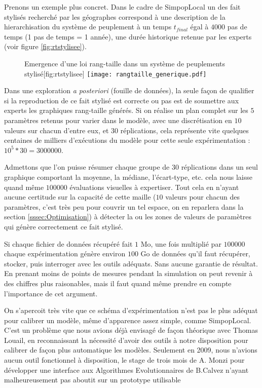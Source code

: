 Prenons un exemple plus concret. Dans le cadre de SimpopLocal \autocites{Schmitt2015,Schmitt2014} un des fait stylisés recherché par les géographes correspond à une description de la hierarchisation du système de peuplement à un temps $t_{final}$ égal à $4000$ pas de temps (1 pas de temps = 1 année), une durée historique retenue par les experts (voir figure \ref{fig:rtstylisee}).

\begin{figure}[h]
	\begin{sidecaption}{Emergence d'une loi rang-taille dans un système de peuplements stylisé}[fig:rtstylisee]
		\centering
		\texttt{[image: rangtaille\_generique.pdf]}{
		}
  \end{sidecaption}
\end{figure}

Dans une exploration \textit{a posteriori} (fouille de données), la seule façon de qualifier si la reproduction de ce fait stylisé est correcte ou pas est de soumettre aux experts les graphiques rang-taille générés. Si on réalise un plan complet sur les $5$ paramètres retenus pour varier dans le modèle, avec une discrétisation en $10$ valeurs sur chacun d'entre eux, et $30$ réplications, cela représente vite quelques centaines de milliers d'exécutions du modèle pour cette seule expérimentation : $10^{5} * 30 = \num{3000000}$.

Admettons que l'on puisse résumer chaque groupe de $30$ réplications dans un seul graphique comportant la moyenne, la médiane, l'écart-type, etc. cela nous laisse quand même $\num{100000}$ évaluations visuelles à expertiser. Tout cela en n'ayant aucune certitude sur la capacité de cette maille ($10$ valeurs pour chacun des paramètres, c'est très peu pour couvrir un tel espace, on en reparlera dans la section \ref{sssec:Optimisation}) à détecter la ou les zones de valeurs de paramètres qui génère correctement ce fait stylisé.

Si chaque fichier de données récupéré fait $1$ Mo, une fois multiplié par $\num{100000}$ chaque expérimentation génère environ $100$ Go de données qu'il faut récupérer, stocker, puis interroger avec les outils adéquats. Sans aucune garantie de résultat. En prenant moins de points de mesures pendant la simulation on peut revenir à des chiffres plus raisonables, mais il faut quand même prendre en compte l'importance de cet argument.

On s'apercoit très vite que ce schéma d'expérimentation n'est pas le plus adéquat pour calibrer un modèle, même d'apparence assez simple, comme SimpopLocal. C'est un problème que nous avions déjà envisagé de façon théorique avec Thomas Louail, en reconnaissant la nécessité d'avoir des outils à notre disposition pour calibrer de façon plus automatique les modèles. Seulement en 2009, nous n'avions aucun outil fonctionnel à disposition, le stage de trois mois de A. Monzi pour développer une interface aux Algorithmes Evolutionnaires de B.Calvez n'ayant malheureusement pas aboutit sur un prototype utilisable \autocite[140-141]{Louail2010}

